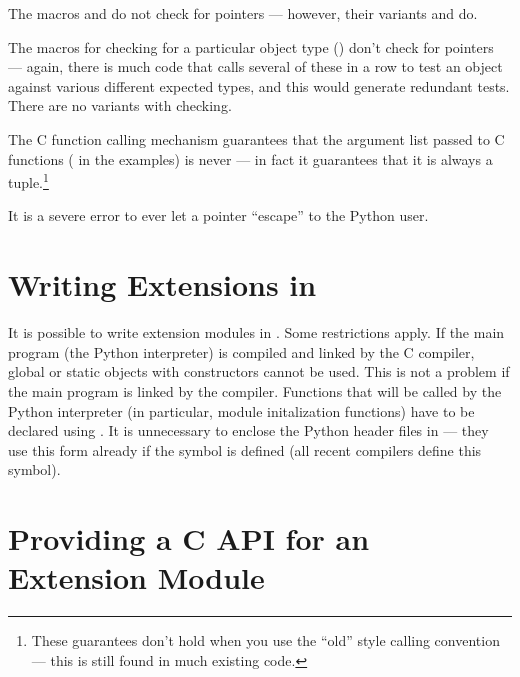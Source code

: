 \documentclass{manual}
\begin{document}
The macros  and 
do not check for \NULL{} pointers --- however, their variants
 and  do.

The macros for checking for a particular object type
() don't check for \NULL{} pointers ---
again, there is much code that calls several of these in a row to test
an object against various different expected types, and this would
generate redundant tests.  There are no variants with \NULL{}
checking.

The C function calling mechanism guarantees that the argument list
passed to C functions ( in the examples) is never
\NULL{} --- in fact it guarantees that it is always a tuple.\footnote{
These guarantees don't hold when you use the ``old'' style
calling convention --- this is still found in much existing code.}

It is a severe error to ever let a \NULL{} pointer ``escape'' to
the Python user.



\section{Writing Extensions in \Cpp{}
         \label{cplusplus}}

It is possible to write extension modules in \Cpp{}.  Some restrictions
apply.  If the main program (the Python interpreter) is compiled and
linked by the C compiler, global or static objects with constructors
cannot be used.  This is not a problem if the main program is linked
by the \Cpp{} compiler.  Functions that will be called by the
Python interpreter (in particular, module initalization functions)
have to be declared using .
It is unnecessary to enclose the Python header files in
 --- they use this form already if the symbol
 is defined (all recent \Cpp{} compilers define this
symbol).


\section{Providing a C API for an Extension Module
         \label{using-cobjects}}
\end{document}
